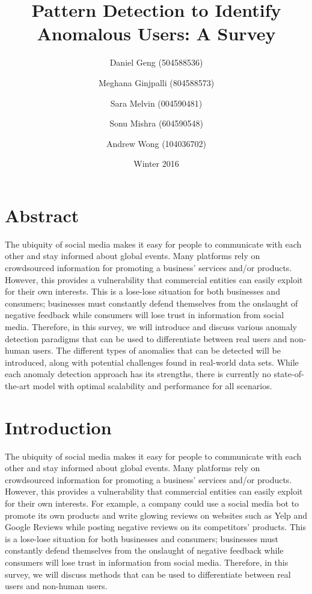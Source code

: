 \documentclass[11pt, oneside]{article}   	%
\title{Pattern Detection to Identify Anomalous Users: A Survey}
\author{
  Daniel Geng (504588536)\\
  \and
  Meghana Ginjpalli (804588573)\\
  \and
  Sara Melvin (004590481)\\
  \and
  Sonu Mishra (604590548)\\
  \and
  Andrew Wong (104036702)
}
\date{Winter 2016}
\begin{document}
\maketitle

\section*{Abstract}
The ubiquity of social media makes it easy for people to communicate with each other and stay informed about global events.
Many platforms rely on crowdsourced information for promoting a business' services and/or products.
However, this provides a vulnerability that commercial entities can easily exploit for their own interests.
This is a lose-lose situation for both businesses and consumers; businesses must constantly defend themselves from the onslaught of negative feedback while consumers will lose trust in information from social media.
Therefore, in this survey, we will introduce and discuss various anomaly detection paradigms that can be used to differentiate between real users and non-human users.
The different types of anomalies that can be detected will be introduced, along with potential challenges found in real-world data sets.
While each anomaly detection approach has its strengths, there is currently no state-of-the-art model with optimal scalability and performance for all scenarios.

\section{Introduction} \label{background}

\quad The ubiquity of social media makes it easy for people to communicate with each other and stay informed about global events.
Many platforms rely on crowdsourced information for promoting a business' services and/or products.
However, this provides a vulnerability that commercial entities can easily exploit for their own interests.
For example, a company could use a social media bot to promote its own products and write glowing reviews on websites such as Yelp and Google Reviews while posting negative reviews on its competitors' products.
This is a lose-lose situation for both businesses and consumers; businesses must constantly defend themselves from the onslaught of negative feedback while consumers will lose trust in information from social media.
Therefore, in this survey, we will discuss methods that can be used to differentiate between real users and non-human users.
\end{document}

